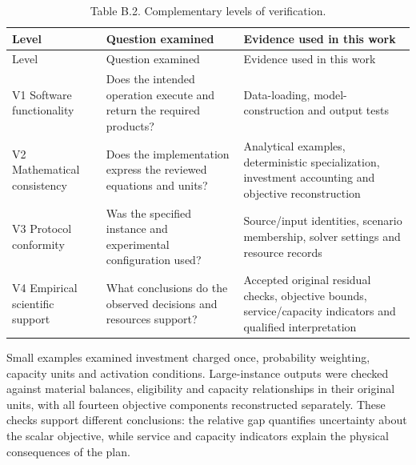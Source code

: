 \documentclass[
  english,
  11pt,
  a4paper,
]{article}
\begin{document}
\begin{longtable}[]{@{}
  >{\raggedright\arraybackslash}p{}
  >{\raggedright\arraybackslash}p{}
  >{\raggedright\arraybackslash}p{}@{}}
\caption{Table B.2. Complementary levels of
verification.}\tabularnewline
\toprule\noalign{}
\begin{minipage}[b]{\linewidth}\raggedright
Level
\end{minipage} & \begin{minipage}[b]{\linewidth}\raggedright
Question examined
\end{minipage} & \begin{minipage}[b]{\linewidth}\raggedright
Evidence used in this work
\end{minipage} \\
\midrule\noalign{}
\endfirsthead
\toprule\noalign{}
\begin{minipage}[b]{\linewidth}\raggedright
Level
\end{minipage} & \begin{minipage}[b]{\linewidth}\raggedright
Question examined
\end{minipage} & \begin{minipage}[b]{\linewidth}\raggedright
Evidence used in this work
\end{minipage} \\
\midrule\noalign{}
\endhead
\bottomrule\noalign{}
\endlastfoot
V1 Software functionality & Does the intended operation execute and
return the required products? & Data-loading, model-construction and
output tests \\
V2 Mathematical consistency & Does the implementation express the
reviewed equations and units? & Analytical examples, deterministic
specialization, investment accounting and objective reconstruction \\
V3 Protocol conformity & Was the specified instance and experimental
configuration used? & Source/input identities, scenario membership,
solver settings and resource records \\
V4 Empirical scientific support & What conclusions do the observed
decisions and resources support? & Accepted original residual checks,
objective bounds, service/capacity indicators and qualified
interpretation \\
\end{longtable}

Small examples examined investment charged once, probability weighting,
capacity units and activation conditions. Large-instance outputs were
checked against material balances, eligibility and capacity
relationships in their original units, with all fourteen objective
components reconstructed separately. These checks support different
conclusions: the relative gap quantifies uncertainty about the scalar
objective, while service and capacity indicators explain the physical
consequences of the plan.
\end{document}
